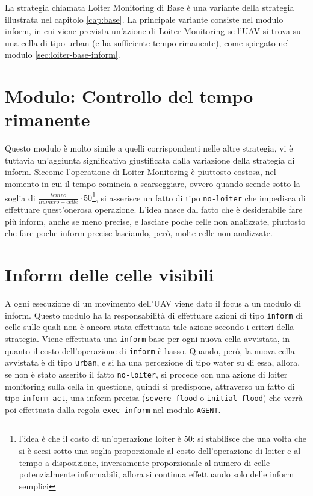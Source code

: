 La strategia chiamata Loiter Monitoring di Base è una variante della strategia illustrata nel capitolo \ref{cap:base}. La principale variante consiste nel modulo inform, in cui viene prevista un'azione di Loiter Monitoring se l'UAV si trova su una cella di tipo urban (e ha sufficiente tempo rimanente), come spiegato nel modulo \ref{sec:loiter-base-inform}.

\section{Modulo: Controllo del tempo rimanente} \label{sec:loiter-base-tempo}
Questo modulo è molto simile a quelli corrispondenti nelle altre strategia, vi è tuttavia un'aggiunta significativa giustificata dalla variazione della strategia di inform. Siccome l'operatione di Loiter Monitoring è piuttosto costosa, nel momento in cui il tempo comincia a scarseggiare, ovvero quando scende sotto la soglia di $ \frac{tempo}{numero-celle} \cdot 50 $\footnote{l'idea è che il costo di un'operazione loiter è 50: si stabilisce che una volta che si è scesi sotto una soglia proporzionale al costo dell'operazione di loiter e al tempo a disposizione, inversamente proporzionale al numero di celle potenzialmente informabili, allora si continua effettuando solo delle inform semplici}, si asserisce un fatto di tipo \texttt{no-loiter} che impedisca di effettuare quest'onerosa operazione. L'idea nasce dal fatto che è desiderabile fare più inform, anche se meno precise, e lasciare poche celle non analizzate, piuttosto che fare poche inform precise lasciando, però, molte celle non analizzate.

\section{Inform delle celle visibili} \label{sec:loiter-rel-inform}
A ogni esecuzione di un movimento dell'UAV viene dato il focus a un modulo di inform. Questo modulo ha la responsabilità di effettuare azioni di tipo \texttt{inform} di celle sulle quali non è ancora stata effettuata tale azione secondo i criteri della strategia. Viene effettuata una \texttt{inform} base per ogni nuova cella avvistata, in quanto il costo dell'operazione di \texttt{inform} è basso. Quando, però, la nuova cella avvistata è di tipo \texttt{urban}, e si ha una percezione di tipo water su di essa, allora, se non è stato asserito il fatto \texttt{no-loiter}, si procede con una azione di loiter monitoring sulla cella in questione, quindi si predispone, attraverso un fatto di tipo \texttt{inform-act}, una inform precisa (\texttt{severe-flood} o \texttt{initial-flood}) che verrà poi effettuata dalla regola \texttt{exec-inform} nel modulo \texttt{AGENT}.
